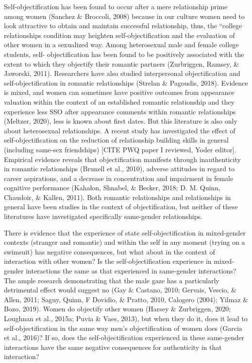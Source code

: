 \documentclass[
  man]{apa6}
\begin{document}
Self-objectification has been found to occur after a mere relationship
prime among women (Sanchez \& Broccoli, 2008) because in our culture
women need to look attractive to obtain and maintain successful
relationship, thus, the ``college relationships condition may heighten
self-objectification and the evaluation of other women in a sexualized
way. Among heterosexual male and female college students, self-
objectification has been found to be positively associated with the
extent to which they objectify their romantic partners (Zurbriggen,
Ramsey, \& Jaworski, 2011). Researchers have also studied interpersonal
objectification and self-objectification in romantic relationships
(Strelan \& Pagoudis, 2018). Evidence is mixed, and women can sometimes
have positive outcomes from appearance valuation within the context of
an established romantic relationship and they experience less SSO after
appearance comments within romantic relationships (Meltzer, 2020), less
is known about first dates. But this literature is also only about
heterosexual relationships. A recent study has investigated the effect
of self-objectification on the reduction of relationship building skills
in general (including same-sex friendships) {[}CITE PWQ paper I
reviewed, Yoder editor{]}. Empirical evidence reveals that
objectification manifests through inauthenticity in romantic
relationships (Brunell et al., 2010), adverse attitudes in regard to
career aspirations, and a decrease in concentration and impairment in
female cognitive performance (Kahalon, Shnabel, \& Becker, 2018; D. M.
Quinn, Chaudoir, \& Kallen, 2011). Both romantic relationships and
relationships in general have been studies in the context of
objectification, but neither of these literatures have investigated
specifically same-gender relationships.

There is evidence that the experience of state self-objectification in
mixed-gender contexts (stranger and romantic) and within the self in any
moment (trying on a swimsuit) has negative consequences, but what about
in the context of interaction with other women? Is the
self-objectification experience in mixed-gender interactions the same as
that experienced in same-gender interactions? The ample research
demonstrating that the male gaze has a particularly detrimental effect
would suggest no (Gay \& Castano, 2010; Gervais, Vescio, \& Allen, 2011;
Saguy, Quinn, F Dovidio, \& Pratto, 2010, Calogero (2004); Yilmaz \&
Bozo, 2019). Women do objectify other women (Harsey \& Zurbriggen, 2020;
Loughnan et al., 2015a; Puvia \& Vaes, 2013), but when they do it, does
it lead to self-objectification in the same way men's objectification of
women does (Garcia et al., 2016)? If so, does the self-objectification
experienced in these same-gender interactions have the same negative
consequences for authenticity in that interaction?
\end{document}
